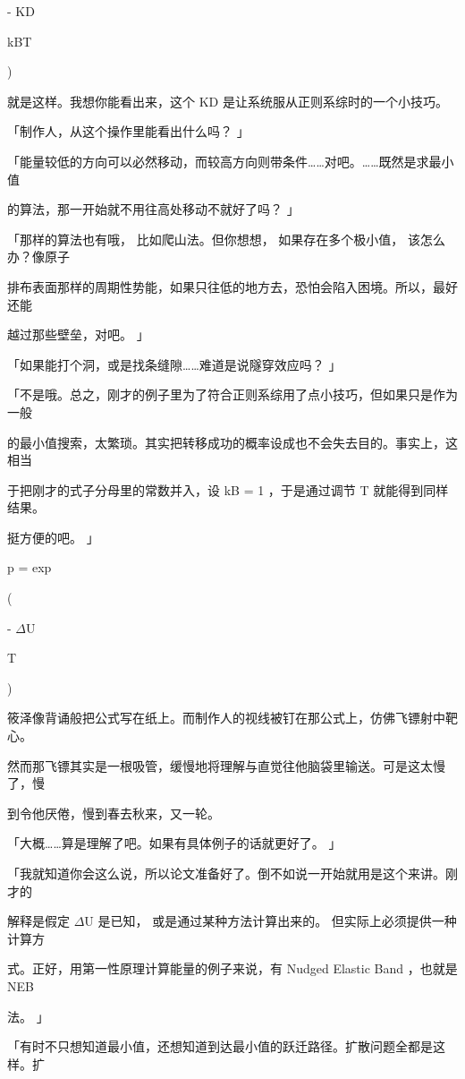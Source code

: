 - KD\par
kBT\par
)\par
就是这样。我想你能看出来，这个 KD 是让系统服从正则系综时的一个小技巧。\par
「制作人，从这个操作里能看出什么吗？ 」\par
「能量较低的方向可以必然移动，而较高方向则带条件……对吧。……既然是求最小值\par
的算法，那一开始就不用往高处移动不就好了吗？ 」\par
「那样的算法也有哦， 比如爬山法。但你想想， 如果存在多个极小值， 该怎么办？像原子\par
排布表面那样的周期性势能，如果只往低的地方去，恐怕会陷入困境。所以，最好还能\par

越过那些壁垒，对吧。 」\par
「如果能打个洞，或是找条缝隙……难道是说隧穿效应吗？ 」\par
「不是哦。总之，刚才的例子里为了符合正则系综用了点小技巧，但如果只是作为一般\par
的最小值搜索，太繁琐。其实把转移成功的概率设成也不会失去目的。事实上，这相当\par
于把刚才的式子分母里的常数并入，设 kB = 1 ，于是通过调节 T 就能得到同样结果。\par
挺方便的吧。 」\par
p = exp\par
(\par
- $\Delta$U\par
T\par
)\par
筱泽像背诵般把公式写在纸上。而制作人的视线被钉在那公式上，仿佛飞镖射中靶心。\par
然而那飞镖其实是一根吸管，缓慢地将理解与直觉往他脑袋里输送。可是这太慢了，慢\par
到令他厌倦，慢到春去秋来，又一轮。\par
「大概……算是理解了吧。如果有具体例子的话就更好了。 」\par
「我就知道你会这么说，所以论文准备好了。倒不如说一开始就用是这个来讲。刚才的\par
解释是假定 $\Delta$U 是已知， 或是通过某种方法计算出来的。 但实际上必须提供一种计算方\par
式。正好，用第一性原理计算能量的例子来说，有 Nudged Elastic Band ，也就是 NEB\par
法。 」\par
「有时不只想知道最小值，还想知道到达最小值的跃迁路径。扩散问题全都是这样。扩\par
